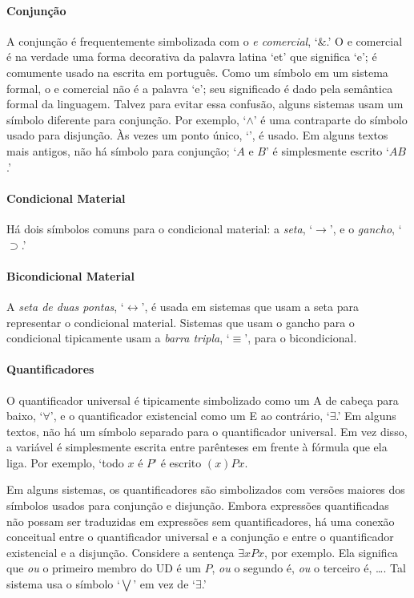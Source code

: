\paragraph{Conjunção}
A conjunção é frequentemente simbolizada com o \emph{e comercial}, `{\&}.' O e comercial é na verdade uma forma decorativa da palavra latina `et' que significa `e'; é comumente usado na escrita em português. Como um símbolo em um sistema formal, o e comercial não é a palavra `e'; seu significado é dado pela semântica formal da linguagem. Talvez para evitar essa confusão, alguns sistemas usam um símbolo diferente para conjunção. Por exemplo, `$\wedge$' é uma contraparte do símbolo usado para disjunção. Às vezes um ponto único, `{\scriptsize\textbullet}', é usado. Em alguns textos mais antigos, não há símbolo para conjunção; `$A$ e $B$' é simplesmente escrito `$AB$.'

\paragraph{Condicional Material} Há dois símbolos comuns para o condicional material: a \emph{seta}, `$\rightarrow$', e o \emph{gancho}, `$\supset$.'

\paragraph{Bicondicional Material} A \emph{seta de duas pontas}, `$\leftrightarrow$', é usada em sistemas que usam a seta para representar o condicional material. Sistemas que usam o gancho para o condicional tipicamente usam a \emph{barra tripla}, `$\equiv$', para o bicondicional.

\paragraph{Quantificadores} O quantificador universal é tipicamente simbolizado como um A de cabeça para baixo, `$\forall$', e o quantificador existencial como um E ao contrário, `$\exists$.' Em alguns textos, não há um símbolo separado para o quantificador universal. Em vez disso, a variável é simplesmente escrita entre parênteses em frente à fórmula que ela liga. Por exemplo, `todo $x$ é $P$' é escrito $(x)Px$.

Em alguns sistemas, os quantificadores são simbolizados com versões maiores dos símbolos usados para conjunção e disjunção. Embora expressões quantificadas não possam ser traduzidas em expressões sem quantificadores, há uma conexão conceitual entre o quantificador universal e a conjunção e entre o quantificador existencial e a disjunção. Considere a sentença $\exists x Px$, por exemplo. Ela significa que \emph{ou} o primeiro membro do UD é um $P$, \emph{ou} o segundo é, \emph{ou} o terceiro é, {\ldots}. Tal sistema usa o símbolo `$\bigvee$' em vez de `$\exists$.'

